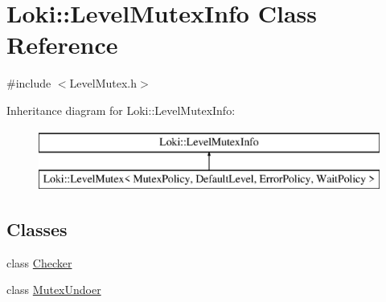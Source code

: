 \hypertarget{classLoki_1_1LevelMutexInfo}{}\section{Loki\+:\+:Level\+Mutex\+Info Class Reference}
\label{classLoki_1_1LevelMutexInfo}


{\ttfamily \#include $<$Level\+Mutex.\+h$>$}

Inheritance diagram for Loki\+:\+:Level\+Mutex\+Info\+:\begin{figure}[H]
\begin{center}
\leavevmode
\includegraphics[height=2.000000cm]{classLoki_1_1LevelMutexInfo}
\end{center}
\end{figure}
\subsection*{Classes}
\begin{DoxyCompactItemize}
\item 
class \hyperlink{classLoki_1_1LevelMutexInfo_1_1Checker}{Checker}
\item 
class \hyperlink{classLoki_1_1LevelMutexInfo_1_1MutexUndoer}{Mutex\+Undoer}
\end{DoxyCompactItemize}
